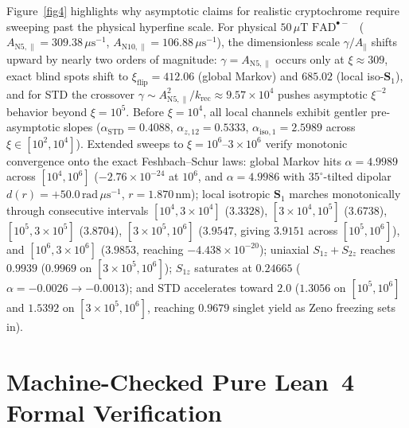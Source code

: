 \documentclass[twocolumn,10pt,amsmath,amssymb,floatfix]{revtex4-2}
\theoremstyle{plain}
\theoremstyle{definition}
\newcommand{\xiflip}{\xi_{\mathrm{flip}}}
\begin{document}
Figure~\ref{fig4} highlights why asymptotic claims for realistic cryptochrome require sweeping past the physical hyperfine scale. For physical $50\,\mu\text{T}$ $\mathrm{FAD}^{\bullet-}$~\cite{Lee2014JRSocInterface,Hore2016ARB} ($A_{\mathrm{N5},\parallel} = 309.38\,\mu\text{s}^{-1}$, $A_{\mathrm{N10},\parallel} = 106.88\,\mu\text{s}^{-1}$), the dimensionless scale $\gamma/A_\parallel$ shifts upward by nearly two orders of magnitude: $\gamma = A_{\mathrm{N5},\parallel}$ occurs only at $\xi \approx 309$, exact blind spots shift to $\xiflip = 412.06$ (global Markov) and $685.02$ (local iso-$\mathbf{S}_1$), and for STD the crossover $\gamma \sim A_{\mathrm{N5},\parallel}^2/k_{\mathrm{rec}} \approx 9.57\times 10^4$ pushes asymptotic $\xi^{-2}$ behavior beyond $\xi = 10^5$. Before $\xi=10^4$, all local channels exhibit gentler pre-asymptotic slopes ($\alpha_{\mathrm{STD}} = 0.4088$, $\alpha_{z,12}=0.5333$, $\alpha_{\mathrm{iso},1}=2.5989$ across $\xi \in [10^2,10^4]$). Extended sweeps to $\xi = 10^6$--$3{\times}10^6$ verify monotonic convergence onto the exact Feshbach--Schur laws: global Markov hits $\alpha = 4.9989$ across $[10^4, 10^6]$ ($-2.76\times 10^{-24}$ at $10^6$, and $\alpha = 4.9986$ with $35^\circ$-tilted dipolar $d(r)=+50.0\,\text{rad}\,\mu\text{s}^{-1}$, $r=1.870\,\text{nm}$); local isotropic $\mathbf{S}_1$ marches monotonically through consecutive intervals $[10^4,3{\times}10^4]$ ($3.3328$), $[3{\times}10^4,10^5]$ ($3.6738$), $[10^5,3{\times}10^5]$ ($3.8704$), $[3{\times}10^5,10^6]$ ($3.9547$, giving $3.9151$ across $[10^5,10^6]$), and $[10^6,3{\times}10^6]$ ($3.9853$, reaching $-4.438\times 10^{-20}$); uniaxial $S_{1z}+S_{2z}$ reaches $0.9939$ ($0.9969$ on $[3{\times}10^5, 10^6]$); $S_{1z}$ saturates at $0.24665$ ($\alpha = -0.0026 \to -0.0013$); and STD accelerates toward $2.0$ ($1.3056$ on $[10^5,10^6]$ and $1.5392$ on $[3{\times}10^5,10^6]$, reaching $0.9679$ singlet yield as Zeno freezing sets in).

\section{Machine-Checked Pure Lean~4 Formal Verification}
\label{sec:lean}
\end{document}
